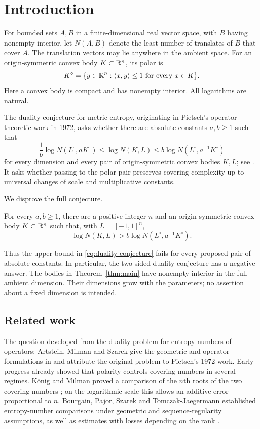 \section{Introduction}\label{sec:introduction}

For bounded sets $A,B$ in a finite-dimensional real vector space, with
$B$ having nonempty interior, let $N(A,B)$ denote the least number of
translates of $B$ that cover $A$. The translation vectors may lie anywhere
in the ambient space. For an origin-symmetric convex body
$K\subset\mathbb R^n$, its polar is
\[
 K^\circ=\{y\in\mathbb R^n:\langle x,y\rangle\le1
                    \text{ for every }x\in K\}.
\]
Here a convex body is compact and has nonempty interior. All logarithms
are natural.

The duality conjecture for metric entropy, originating in Pietsch's
operator-theoretic work in 1972, asks whether there are absolute constants
$a,b\ge1$ such that
\begin{equation}\label{eq:duality-conjecture}
 \frac1b\log N(L^\circ,aK^\circ)
 \le \log N(K,L)
 \le b\log N(L^\circ,a^{-1}K^\circ)
\end{equation}
for every dimension and every pair of origin-symmetric convex bodies
$K,L$; see \cite[Conjecture~1]{AMSTJ2004}.
It asks whether passing to the polar pair preserves covering complexity
up to universal changes of scale and multiplicative constants.

We disprove the full conjecture.

\begin{theorem}\label{thm:main}
For every $a,b\ge1$, there are a positive integer $n$ and an
origin-symmetric convex body $K\subset\mathbb R^n$ such that, with
$L=[-1,1]^n$,
\[
 \log N(K,L)>b\log N(L^\circ,a^{-1}K^\circ).
\]
\end{theorem}

Thus the upper bound in \eqref{eq:duality-conjecture} fails for every
proposed pair of absolute constants. In particular, the two-sided
duality conjecture has a negative answer. The bodies in
Theorem~\ref{thm:main} have nonempty interior in the full ambient
dimension. Their dimensions grow with the parameters; no assertion
about a fixed dimension is intended.

\subsection{Related work}

The question developed from the duality problem for entropy numbers of
operators; Artstein, Milman and Szarek give the geometric and operator
formulations in \cite[pp.~1314--1315]{AMS2004} and attribute the original
problem to Pietsch's 1972 work. Early progress already showed that
polarity controls covering numbers in several regimes. K\"onig and Milman
proved a comparison of the $n$th roots of the two covering numbers
\cite[Theorem~1]{KonigMilman1987}; on the logarithmic scale this allows
an additive error proportional to $n$. Bourgain, Pajor, Szarek and
Tomczak-Jaegermann established entropy-number comparisons under
geometric and sequence-regularity assumptions, as well as estimates
with losses depending on the rank \cite{BPSTJ1989}.


